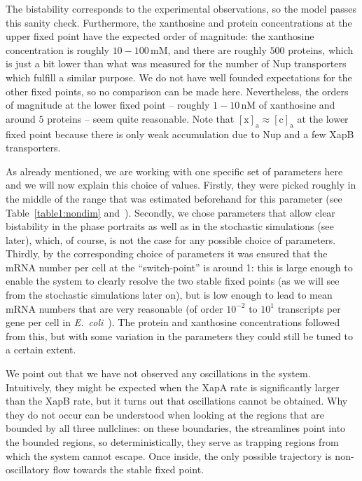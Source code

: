 \documentclass[10pt,letterpaper]{article}
\newcommand{\unit}[1]{\,\mathrm{#1}}
\newcommand{\n}[1]{\mathrm{#1}}
\begin{document}
	The bistability corresponds to the experimental observations, so the model passes this
	sanity check. Furthermore, the xanthosine and protein concentrations at the
	upper fixed point have the expected order of magnitude: the xanthosine
	concentration is roughly $10-100 \unit{mM}$, and there are roughly $500$
	proteins, which is just a bit lower than what was measured for the number of
	Nup transporters~\cite{Li2014} which fulfill a similar purpose. We do not
	have well founded expectations for the other fixed points, so no comparison
	can be made here. Nevertheless, the orders of magnitude at the lower fixed
	point -- roughly $1-10 \unit{nM}$ of xanthosine and around $5$ proteins --
	seem quite reasonable. Note that $\n{[x]_a} \approx \n{[c]_a}$ at the
	lower fixed point because there is only weak accumulation due to Nup and a
	few XapB transporters.
	
	As already mentioned, we are working with one specific set of parameters
	here and we will now explain this choice of values. Firstly, they were
	picked roughly in the middle of the range that was estimated beforehand for this parameter (see Table~\ref{table1:nondim} and~). Secondly, we
	chose parameters that allow clear bistability in the phase portraits as well as in the
	stochastic simulations (see later), which, of course, is not the case for any possible choice of parameters. Thirdly, by the corresponding choice of
	parameters it was ensured that the mRNA number per cell at the
	``switch-point'' is around 1: this is large enough to enable the system to
	clearly resolve the two stable fixed points (as we will see from the
	stochastic simulations later on), but is low enough to lead to mean mRNA
	numbers that are very reasonable (of order $10^{-2}$ to $10^{1}$
	transcripts per gene per cell in \textit{E.\ coli}~\cite{Milo2016}).
	The protein and xanthosine
	concentrations followed from this, but with some variation in the parameters
	they could still be tuned to a certain extent.
	
	We point out that we have not observed any oscillations in the
	system. Intuitively, they might be expected when the XapA rate is
	significantly larger than the XapB rate, but it turns out that oscillations
	cannot be obtained. Why they do not occur can be understood when looking at the regions that
	are bounded by all three nullclines: on these boundaries, the streamlines
	point into the bounded regions, so deterministically, they serve as
	trapping regions from which the system cannot escape. Once inside, the only
	possible trajectory is non-oscillatory flow towards the stable fixed point.
	
\end{document}
